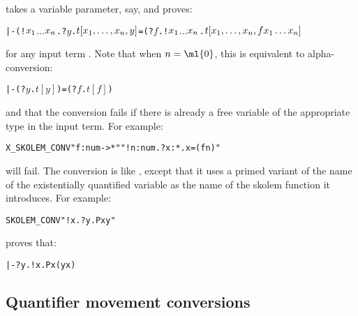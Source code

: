 \noindent takes a variable parameter,  say, and
proves:

\begin{hol}\begin{alltt}
   |- (!\(x\sb{1}\) \(\ldots\) \(x\sb{n}\). ?\(y\). \(t[x\sb{1},\ldots,x\sb{n},y]\)  =  (?\(f\). !\(x\sb{1}\) \(\ldots\) \(x\sb{n}\). \(t[x\sb{1},\ldots,x\sb{n},f x\sb{1}\ldots x\sb{n}]\)
\end{alltt}\end{hol}

\noindent for any input term
.
Note that when $n=\ml{0}$, this
is equivalent to alpha-conversion:

\begin{hol}\begin{alltt}
  |- (?\(y\). \(t[y]\)) = (?\(f\). \(t[f]\))
\end{alltt}\end{hol}

\noindent and that the conversion fails if there is already a free
variable  of the appropriate type in the input term. For example:

\begin{hol}\begin{alltt}
  X_SKOLEM_CONV "f:num->*" "!n:num. ?x:*. x = (f n)"
\end{alltt}\end{hol}

\noindent will fail.  The conversion  is
like , except that it
uses a primed variant of the name of the existentially quantified variable
as the name of the skolem function it introduces.  For example:

\begin{hol}\begin{alltt}
  SKOLEM_CONV "!x. ?y. P x y"
\end{alltt}\end{hol}

\noindent proves that:

\begin{hol}\begin{alltt}
  |- ?y. !x. P x (y x)
\end{alltt}\end{hol}


\subsection{Quantifier movement conversions}

